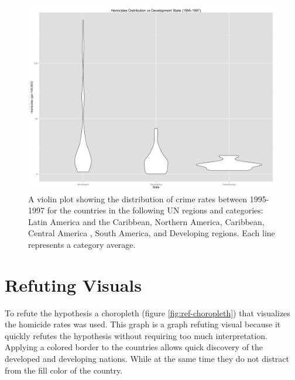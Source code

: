 \documentclass[12pt]{article}
\begin{document}
\begin{figure}[!ht]
    \centering
    \includegraphics[width=7in, keepaspectratio]{supporting_visual_violin.png}
    \caption{A violin plot showing the distribution of crime rates between 1995-1997 for the countries in the following UN regions and categories: Latin America and the Caribbean, Northern America, Caribbean, Central America , South America, and Developing regions. Each line represents a category average.}
    \label{fig:sup-violin}
\end{figure}

\section{Refuting Visuals}
To refute the hypothesis a choropleth (figure \ref{fig:ref-choropleth}) that visualizes the homicide rates was used. This graph is a graph refuting visual because it quickly refutes the hypothesis without requiring too much interpretation. Applying a colored border to the countries allows quick discovery of the developed and developing nations. While at the same time they do not distract from the fill color of the country. 
\end{document}
